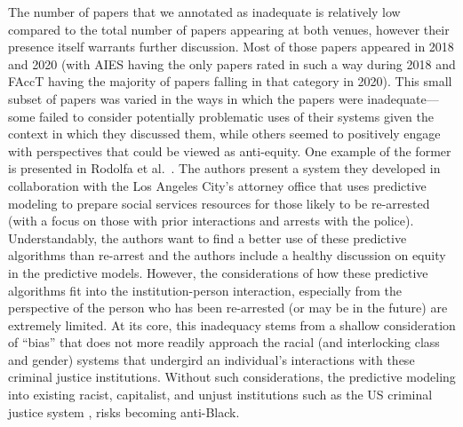 \documentclass[manuscript]{acmart}
\begin{document}
The number of papers that we annotated as inadequate is relatively low compared to the total number of papers appearing at both venues, however their presence itself warrants further discussion. %
Most of those papers appeared in 2018 and 2020 (with AIES having the only papers rated in such a way during 2018 and FAccT having the majority of papers falling in that category in 2020). This small subset of papers was varied in the ways in which the papers were inadequate–--some failed to consider potentially problematic uses of their systems given the context in which they discussed them, while others seemed to positively engage with perspectives that could be viewed as anti-equity. One example of the former is presented in Rodolfa et al.~\cite{rodolfa20recidivism}. The authors present a system they developed in collaboration with the Los Angeles City’s attorney office that uses predictive modeling to prepare social services resources for those likely to be re-arrested (with a focus on those with prior interactions and arrests with the police). Understandably, the authors want to find a better use of these predictive algorithms than re-arrest and the authors include a healthy discussion on equity in the predictive models. However, the considerations of how these predictive algorithms fit into the institution-person interaction, especially from the perspective of the person who has been re-arrested (or may be in the future) are extremely limited. At its core, this inadequacy stems from a shallow consideration of ``bias'' that does not more readily approach the racial (and interlocking class and gender) systems that undergird an individual's interactions with these criminal justice institutions. Without such considerations, the %
predictive modeling into %
existing racist, capitalist, and unjust institutions such as the US criminal justice system \cite{muhammadblackness,alexanderjimcrow}, risks becoming %
anti-Black. 
\end{document}
